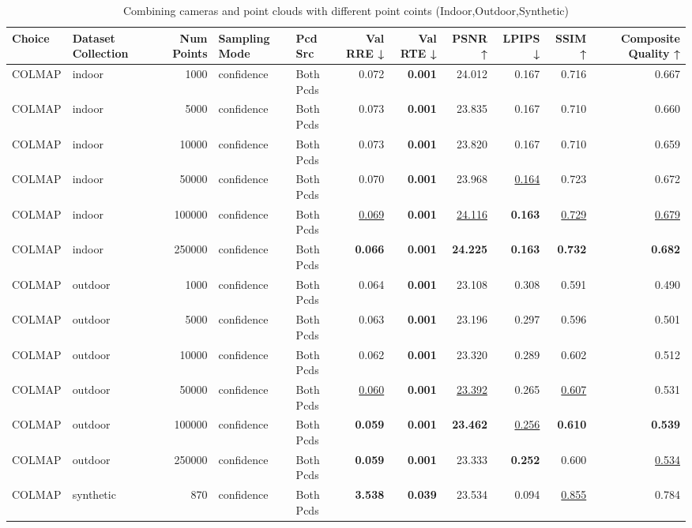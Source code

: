 \begin{table}[H]
\caption{Combining cameras and point clouds with different point coints (Indoor,Outdoor,Synthetic)}
\label{tab:07_combined_num_points_indoor,outdoor,synthetic}
\centering
\scriptsize
\begin{tabular}{llrllrrrrrr}
\toprule
Choice & Dataset Collection & Num Points & Sampling Mode & Pcd Src & Val RRE ↓ & Val RTE ↓ & PSNR ↑ & LPIPS ↓ & SSIM ↑ & Composite Quality ↑ \\
\midrule
COLMAP & indoor & 1000 & confidence & Both Pcds & 0.072 & \textbf{0.001} & 24.012 & 0.167 & 0.716 & 0.667 \\
COLMAP & indoor & 5000 & confidence & Both Pcds & 0.073 & \textbf{0.001} & 23.835 & 0.167 & 0.710 & 0.660 \\
COLMAP & indoor & 10000 & confidence & Both Pcds & 0.073 & \textbf{0.001} & 23.820 & 0.167 & 0.710 & 0.659 \\
COLMAP & indoor & 50000 & confidence & Both Pcds & 0.070 & \textbf{0.001} & 23.968 & \underline{0.164} & 0.723 & 0.672 \\
COLMAP & indoor & 100000 & confidence & Both Pcds & \underline{0.069} & \textbf{0.001} & \underline{24.116} & \textbf{0.163} & \underline{0.729} & \underline{0.679} \\
COLMAP & indoor & 250000 & confidence & Both Pcds & \textbf{0.066} & \textbf{0.001} & \textbf{24.225} & \textbf{0.163} & \textbf{0.732} & \textbf{0.682} \\
\midrule
COLMAP & outdoor & 1000 & confidence & Both Pcds & 0.064 & \textbf{0.001} & 23.108 & 0.308 & 0.591 & 0.490 \\
COLMAP & outdoor & 5000 & confidence & Both Pcds & 0.063 & \textbf{0.001} & 23.196 & 0.297 & 0.596 & 0.501 \\
COLMAP & outdoor & 10000 & confidence & Both Pcds & 0.062 & \textbf{0.001} & 23.320 & 0.289 & 0.602 & 0.512 \\
COLMAP & outdoor & 50000 & confidence & Both Pcds & \underline{0.060} & \textbf{0.001} & \underline{23.392} & 0.265 & \underline{0.607} & 0.531 \\
COLMAP & outdoor & 100000 & confidence & Both Pcds & \textbf{0.059} & \textbf{0.001} & \textbf{23.462} & \underline{0.256} & \textbf{0.610} & \textbf{0.539} \\
COLMAP & outdoor & 250000 & confidence & Both Pcds & \textbf{0.059} & \textbf{0.001} & 23.333 & \textbf{0.252} & 0.600 & \underline{0.534} \\
\midrule
COLMAP & synthetic & 870 & confidence & Both Pcds & \textbf{3.538} & \textbf{0.039} & 23.534 & 0.094 & \underline{0.855} & 0.784 \\

\end{tabular}
\end{table}
